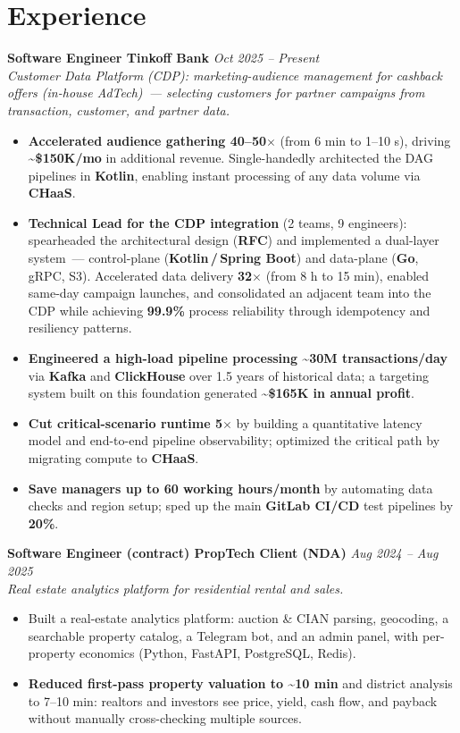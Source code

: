 \documentclass[10pt,a4paper]{article}
\begin{document}
\section*{Experience}
\textbf{Software Engineer \textbar{} Tinkoff Bank} \hfill \textit{Oct 2025 -- Present}\\[0.05em]
{\footnotesize\textit{Customer Data Platform (CDP): marketing-audience management for cashback offers (in-house AdTech)~--- selecting customers for partner campaigns from transaction, customer, and partner data.}}
\begin{itemize}
  \item \textbf{Accelerated audience gathering 40--50$\times$} (from 6 min to 1--10 s), driving \textbf{\textasciitilde\$150K/mo} in additional revenue. Single-handedly architected the DAG pipelines in \textbf{Kotlin}, enabling instant processing of any data volume via \textbf{CHaaS}.
  \item \textbf{Technical Lead for the CDP integration} (2 teams, 9 engineers): spearheaded the architectural design (\textbf{RFC}) and implemented a dual-layer system~--- control-plane (\textbf{Kotlin\,/\,Spring Boot}) and data-plane (\textbf{Go}, gRPC, S3). Accelerated data delivery \textbf{32$\times$} (from 8 h to 15 min), enabled same-day campaign launches, and consolidated an adjacent team into the CDP while achieving \textbf{99.9\%} process reliability through idempotency and resiliency patterns.
  \item \textbf{Engineered a high-load pipeline processing \textasciitilde30M transactions/day} via \textbf{Kafka} and \textbf{ClickHouse} over 1.5 years of historical data; a targeting system built on this foundation generated \textbf{\textasciitilde\$165K in annual profit}.
  \item \textbf{Cut critical-scenario runtime 5$\times$} by building a quantitative latency model and end-to-end pipeline observability; optimized the critical path by migrating compute to \textbf{CHaaS}.
  \item \textbf{Save managers up to 60 working hours/month} by automating data checks and region setup; sped up the main \textbf{GitLab CI/CD} test pipelines by \textbf{20\%}.
\end{itemize}

\vspace{0.22em}
\textbf{Software Engineer (contract) \textbar{} PropTech Client (NDA)} \hfill \textit{Aug 2024 -- Aug 2025}\\[0.05em]
{\footnotesize\textit{Real estate analytics platform for residential rental and sales.}}
\begin{itemize}
  \item Built a real-estate analytics platform: auction \& CIAN parsing, geocoding, a searchable property catalog, a Telegram bot, and an admin panel, with per-property economics (Python, FastAPI, PostgreSQL, Redis).
  \item \textbf{Reduced first-pass property valuation to \textasciitilde10 min} and district analysis to 7--10 min: realtors and investors see price, yield, cash flow, and payback without manually cross-checking multiple sources.
\end{itemize}
\end{document}
